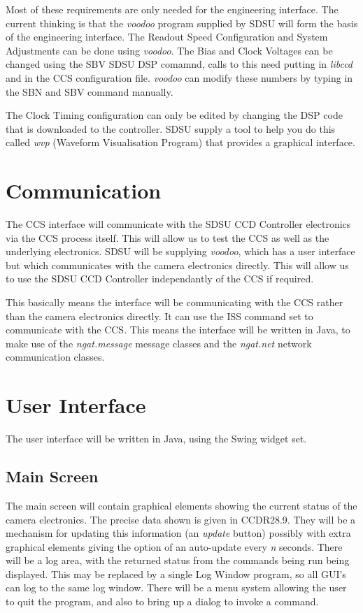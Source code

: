 \documentclass[10pt,a4paper]{article}
\begin{document}
Most of these requirements are only needed for the engineering interface. The current thinking is that the
{\em voodoo} program supplied by SDSU will form the basis of the engineering interface. The 
Readout Speed Configuration and System Adjustments can be done using {\em voodoo}. The Bias and Clock Voltages
can be changed using the SBV SDSU DSP comamnd, calls to this need putting in {\em libccd} and in the CCS
configuration file. {\em voodoo} can modify these numbers by typing in the SBN and SBV command manually.

The Clock Timing configuration can only be edited by changing the DSP code that is downloaded to the
controller. SDSU supply a tool to help you do this called {\em wvp} (Waveform Visualisation Program)
that provides a graphical interface.

\section{Communication}
The CCS interface will communicate with the SDSU CCD Controller electronics via the CCS process
itself. This will allow us to test the CCS as well as the underlying electronics. SDSU will be supplying
{\em voodoo}, which has a user interface but which communicates with the camera electronics directly. This will
allow us to use the SDSU CCD Controller independantly of the CCS if required.

This basically means the interface will be communicating with the CCS rather than the camera electronics
directly. It can use the ISS command set to communicate with the CCS. This means the interface will
be written in Java, to make use of the {\em ngat.message} message classes and the {\em ngat.net} network
communication classes.

\section{User Interface}
The user interface will be written in Java, using the Swing widget set.

\subsection{Main Screen}
The main screen will contain graphical elements showing the current status of the camera electronics.
The precise data shown is given in CCDR28.9. They will be a mechanism for updating this information
(an {\em update} button) possibly with extra graphical elements giving the option of an auto-update every
{\em n} seconds. There will be a log area, with the returned status from the commands being run being displayed. 
This may be replaced by a single Log Window program, so all GUI's can log to the same log window.
There will be a menu system allowing the user to quit the program, and also to bring up
a dialog to invoke a command.
\end{document}

